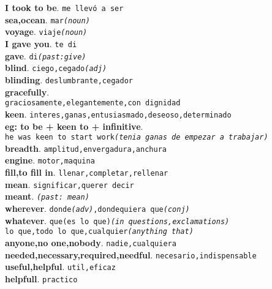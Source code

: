\documentclass[twocolumn]{article}
\begin{document}
	\textsf{\textbf{I took to be}}. \texttt{me llev\'o a ser}\\
	\textsf{\textbf{sea,ocean}}. \texttt{mar{\scriptsize \textsl{(noun)}}}\\
	\textsf{\textbf{voyage}}. \texttt{viaje{\scriptsize \textsl{(noun)}}}\\
	\textsf{\textbf{I gave you}}. \texttt{te di}\\
	\textsf{\textbf{gave}}. \texttt{di{\scriptsize \textsl{(past:give)}}}\\
	\textsf{\textbf{blind}}. \texttt{ciego,cegado{\scriptsize \textsl{(adj)}}}\\
	\textsf{\textbf{blinding}}. \texttt{deslumbrante,cegador}\\
	\textsf{\textbf{gracefully}}.\\\texttt{graciosamente,elegantemente,con dignidad}\\
	\textsf{\textbf{keen}}. \texttt{interes,ganas,entusiasmado,deseoso,determinado}\\
	{\scriptsize \textsf{\textbf{eg: to be + keen to + infinitive}}.\\
	\texttt{he was keen to start work{\scriptsize \textsl{(tenia ganas de empezar a trabajar)}}}}\\
	\textsf{\textbf{breadth}}. \texttt{amplitud,envergadura,anchura}\\
	\textsf{\textbf{engine}}. \texttt{motor,maquina}\\
	\textsf{\textbf{fill,to fill in}}. \texttt{llenar,completar,rellenar}\\
	\textsf{\textbf{mean}}. \texttt{significar,querer decir}\\
	\textsf{\textbf{meant}}. \texttt{{\scriptsize \textsl{(past: mean)}}}\\
	\textsf{\textbf{wherever}}. \texttt{donde{\scriptsize \textsl{(adv)}},dondequiera que{\scriptsize \textsl{(conj)}}}\\
	\textsf{\textbf{whatever}}. \texttt{que(es lo que){\scriptsize \textsl{(in questions,exclamations)}}\\
										         lo que,todo lo que,cualquier{\scriptsize \textsl{(anything that)}}}\\
	\textsf{\textbf{anyone,no one,nobody}}. \texttt{nadie,cualquiera}\\
	\textsf{\textbf{needed,necessary,required,needful}}. \texttt{necesario,indispensable}\\
	\textsf{\textbf{useful,helpful}}. \texttt{util,eficaz}\\
	\textsf{\textbf{helpfull}}. \texttt{practico}\\
\end{document}
